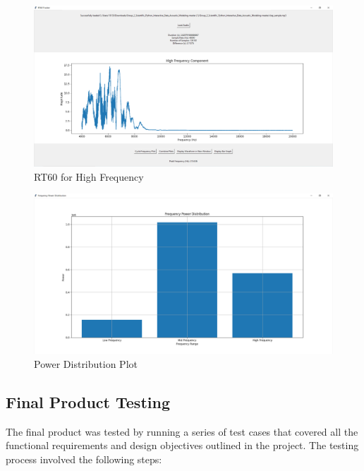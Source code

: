 \documentclass[11pt]{article}
\begin{document}
\begin{figure}[h!]
    \centering
    \includegraphics[width=\textwidth]{highFreq}
    \caption{RT60 for High Frequency}
\end{figure}

\begin{figure}[h!]
    \centering
    \includegraphics[width=\textwidth]{powerDist}
    \caption{Power Distribution Plot}
\end{figure}

\subsection{Final Product Testing}

The final product was tested by running a series of test cases that covered all the functional requirements and design objectives outlined in the project. The testing process involved the following steps:
\end{document}

